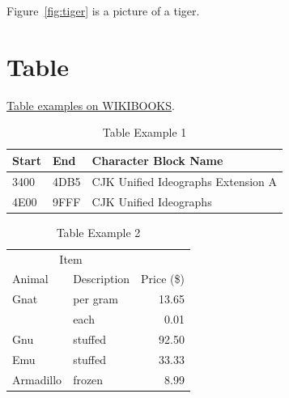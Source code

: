 Figure~\ref{fig:tiger} is a picture of a tiger.



\section{Table}
\label{ss:Table}

\href{http://en.wikibooks.org/wiki/LaTeX/Tables}{Table examples on WIKIBOOKS}.

\begin{table}[htpb]\begin{center}
\caption{Table Example 1}
\begin{tabularx}{8cm}{llX}
\hline
Start & End  & Character Block Name \\
\hline
3400  & 4DB5 & CJK Unified Ideographs Extension A \\
4E00  & 9FFF & CJK Unified Ideographs \\
\hline
\end{tabularx}
 \end{center}\end{table}

\begin{table}[htpb]\begin{center}
\caption{Table Example 2}
\begin{tabular}{llr}
\hline
\multicolumn{2}{c}{Item} \\
\cline{1-2}
Animal & Description & Price (\$) \\
\hline
Gnat  & per gram & 13.65 \\
      & each     &  0.01 \\
Gnu   & stuffed  & 92.50 \\
Emu   & stuffed  & 33.33 \\
Armadillo & frozen & 8.99 \\
\hline
\end{tabular}
 \end{center}\end{table}


